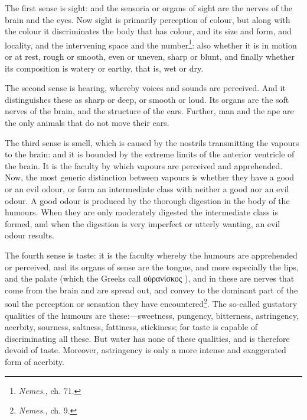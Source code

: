 The first sense is sight: and the sensoria or organs of sight are the nerves of the brain and the eyes. Now sight is primarily perception of colour, but along with the colour it discriminates the body that has colour, and its size and form, and locality, and the intervening space and the number\footnote{\emph{Nemes.,} ch. 71.}: also whether it is in motion or at rest, rough or smooth, even or uneven, sharp or blunt, and finally whether its composition is watery or earthy, that is, wet or dry.

The second sense is hearing, whereby voices and sounds are perceived. And it distinguishes these as sharp or deep, or smooth or loud. Its organs are the soft nerves of the brain, and the structure of the ears. Further, man and the ape are the only animals that do not move their ears.

The third sense is smell, which is caused by the nostrils transmitting the vapours to the brain: and it is bounded by the extreme limits of the anterior ventricle of the brain. It is the faculty by which vapours are perceived and apprehended. Now, the most generic distinction between vapours is whether they have a good or an evil odour, or form an intermediate class with neither a good nor an evil odour. A good odour is produced by the thorough digestion in the body of the humours. When they are only moderately digested the intermediate class is formed, and when the digestion is very imperfect or utterly wanting, an evil odour results.

The fourth sense is taste: it is the faculty whereby the humours are apprehended or perceived, and its organs of sense are the tongue, and more especially the lips, and the palate (which the Greeks call \textgreek{οὐρανίσκος} ), and in these are nerves that come from the brain and are spread out, and convey to the dominant part of the soul the perception or sensation they have encountered\footnote{\emph{Nemes.,} ch. 9.}. The so-called gustatory qualities of the humours are these:—sweetness, pungency, bitterness, astringency, acerbity, sourness, saltness, fattiness, stickiness; for taste is capable of discriminating all these. But water has none of these qualities, and is therefore devoid of taste. Moreover, astringency is only a more intense and exaggerated form of acerbity.

